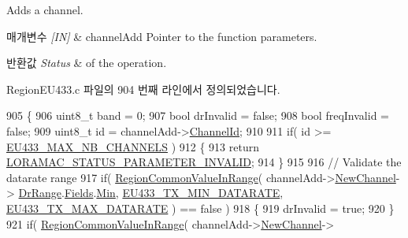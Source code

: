 Adds a channel. 


\begin{DoxyParams}{매개변수}
{\em \mbox{[}\+I\+N\mbox{]}} & channel\+Add Pointer to the function parameters.\\
\hline
\end{DoxyParams}

\begin{DoxyRetVals}{반환값}
{\em Status} & of the operation. \\
\hline
\end{DoxyRetVals}


Region\+E\+U433.\+c 파일의 904 번째 라인에서 정의되었습니다.


\begin{DoxyCode}
905 \{
906     uint8\_t band = 0;
907     \textcolor{keywordtype}{bool} drInvalid = \textcolor{keyword}{false};
908     \textcolor{keywordtype}{bool} freqInvalid = \textcolor{keyword}{false};
909     uint8\_t \textcolor{keywordtype}{id} = channelAdd->\mbox{\hyperlink{structs_channel_add_params_ae23f953dc29c360e56a3c856404a3276}{ChannelId}};
910 
911     \textcolor{keywordflow}{if}( \textcolor{keywordtype}{id} >= \mbox{\hyperlink{group___r_e_g_i_o_n_e_u433_ga800fbd07b871c93758364a0311b87937}{EU433\_MAX\_NB\_CHANNELS}} )
912     \{
913         \textcolor{keywordflow}{return} \mbox{\hyperlink{group___l_o_r_a_m_a_c_gga1d18f26b344040b3ec5c3db662919661ad0d3119f247d00e1787dda106fcb3017}{LORAMAC\_STATUS\_PARAMETER\_INVALID}};
914     \}
915 
916     \textcolor{comment}{// Validate the datarate range}
917     \textcolor{keywordflow}{if}( \mbox{\hyperlink{group___r_e_g_i_o_n_c_o_m_m_o_n_gafdd1c80d953e18d755a631b72a9c3bd3}{RegionCommonValueInRange}}( channelAdd->\mbox{\hyperlink{structs_channel_add_params_afc31493a105479490228fd896b20b45c}{NewChannel}}->
      \mbox{\hyperlink{structs_channel_params_ad4d9b041ea740886a05fa8a1d06997a2}{DrRange}}.\mbox{\hyperlink{unionu_dr_range_a5bdb9afc17112f2ae5f9548f0aee964f}{Fields}}.\mbox{\hyperlink{structu_dr_range_1_1s_fields_ad870086364c5eb410eec40e1025e3203}{Min}}, \mbox{\hyperlink{group___r_e_g_i_o_n_e_u433_ga800fe5b0107ad06f0938c226022b436b}{EU433\_TX\_MIN\_DATARATE}}, 
      \mbox{\hyperlink{group___r_e_g_i_o_n_e_u433_gab53c26fec08fdd51e56cb0c4344f3fe9}{EU433\_TX\_MAX\_DATARATE}} ) == \textcolor{keyword}{false} )
918     \{
919         drInvalid = \textcolor{keyword}{true};
920     \}
921     \textcolor{keywordflow}{if}( \mbox{\hyperlink{group___r_e_g_i_o_n_c_o_m_m_o_n_gafdd1c80d953e18d755a631b72a9c3bd3}{RegionCommonValueInRange}}( channelAdd->\mbox{\hyperlink{structs_channel_add_params_afc31493a105479490228fd896b20b45c}{NewChannel}}->

\end{DoxyCode}
